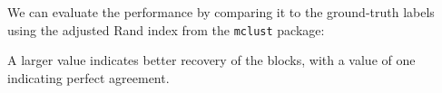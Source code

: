\documentclass{article}
\begin{document}
We can evaluate the performance by comparing it to the ground-truth
labels using the adjusted Rand index
from the \texttt{mclust} package:

\begin{pyconsole}
\end{pyconsole}

A larger value indicates better recovery of the blocks,
with a value of one indicating perfect agreement.
\end{document}
